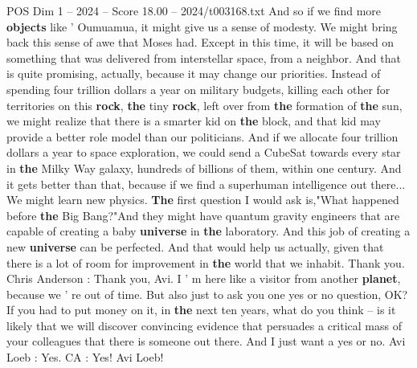 \begin{textsample}{POS Dim 1 – 2024 – Score 18.00 – 2024/t003168.txt}
And so if we find more \textbf{objects} like ' Oumuamua, it might give us a sense of modesty.
We might bring back this sense of awe that Moses had.
Except in this time, it will be based on something that was delivered from interstellar space, from a neighbor.
And that is quite promising, actually, because it may change our priorities.
Instead of spending four trillion dollars a year on military budgets, killing each other for territories on this \textbf{rock}, \textbf{the} tiny \textbf{rock}, left over from \textbf{the} formation of \textbf{the} sun, we might realize that there is a smarter kid on \textbf{the} block, and that kid may provide a better role model than our politicians.
And if we allocate four trillion dollars a year to space exploration, we could send a CubeSat towards every star in \textbf{the} Milky Way galaxy, hundreds of billions of them, within one century.
And it gets better than that, because if we find a superhuman intelligence out there...
We might learn new physics. \textbf{The} first question I would ask is,"What happened before \textbf{the} Big Bang?"And they might have quantum gravity engineers that are capable of creating a baby \textbf{universe} in \textbf{the} laboratory.
And this job of creating a new \textbf{universe} can be perfected.
And that would help us actually, given that there is a lot of room for improvement in \textbf{the} world that we inhabit.
Thank you.
Chris Anderson : Thank you, Avi.
I ' m here like a visitor from another \textbf{planet}, because we ' re out of time.
But also just to ask you one yes or no question, OK?
If you had to put money on it, in \textbf{the} next ten years, what do you think -- is it likely that we will discover convincing evidence that persuades a critical mass of your colleagues that there is someone out there.
And I just want a yes or no.
Avi Loeb : Yes.
CA : Yes!
Avi Loeb!

\end{textsample}
